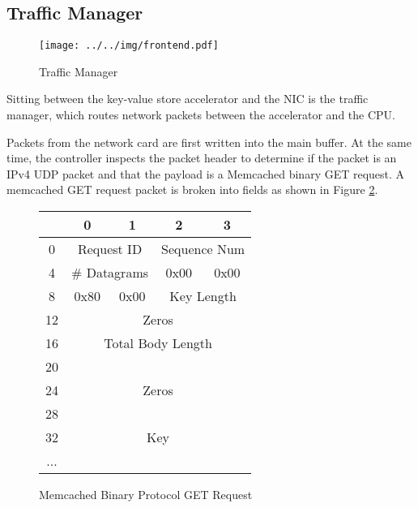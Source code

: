 \subsection{Traffic Manager}
\begin{figure}
    \begin{center}
\texttt{[image: ../../img/frontend.pdf]}
        \caption{Traffic Manager}
        \label{fig:frontend}
    \end{center}
\end{figure}

Sitting between the key-value store accelerator and the NIC is the traffic
manager, which routes network packets between the accelerator and the CPU.

Packets from the network card are first written into the main buffer.
At the same time, the controller inspects the packet header to determine if
the packet is an IPv4 UDP packet and that the payload is a Memcached binary
GET request. A memcached GET request packet is broken into fields as shown in 
Figure \ref{fig:getreq}.

\begin{figure}
\begin{center}
    \begin{tabular}{|c|c|c|c|c|}
        \hline
          & 0 & 1 & 2 & 3 \\
        \hline
        0 & \multicolumn{2}{|c}{Request ID} & \multicolumn{2}{|c|}{Sequence Num} \\
        \hline
        4 & \multicolumn{2}{|c|}{\# Datagrams} & 0x00 & 0x00 \\
        \hline
        8 & 0x80 & 0x00 & \multicolumn{2}{c|}{Key Length} \\
        \hline
        12 & \multicolumn{4}{|c|}{Zeros} \\
        \hline
        16 & \multicolumn{4}{|c|}{Total Body Length} \\
        \hline
        20 & \multicolumn{4}{|c|}{\multirow{3}{*}{Zeros}} \\
        \cline{1-1}
        24 & \multicolumn{4}{|c|}{} \\
        \cline{1-1}
        28 & \multicolumn{4}{|c|}{} \\
        \hline
        32 & \multicolumn{4}{|c|}{Key} \\
        ... & \multicolumn{4}{|c|}{} \\
        \hline
    \end{tabular}
        \caption{Memcached Binary Protocol GET Request}
        \label{fig:getreq}
    \end{center}
\end{figure}


